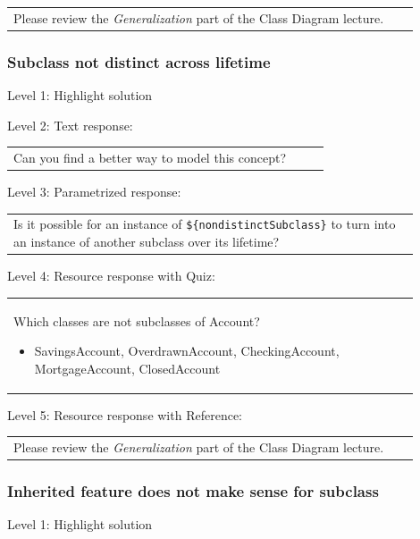 \begin{tabular}{|p{0.9\linewidth}}
Please review the \textit{Generalization} part of the Class Diagram lecture.
\end{tabular} \medskip


\subsubsection{Subclass not distinct across lifetime}

\noindent Level 1: Highlight solution  \medskip

\noindent Level 2: Text response: \medskip

\begin{tabular}{|p{0.9\linewidth}}
Can you find a better way to model this concept?
\end{tabular} \medskip

\noindent Level 3: Parametrized response: \medskip

\begin{tabular}{|p{0.9\linewidth}}
Is it possible for an instance of \verb|${nondistinctSubclass}| to turn into an instance of another subclass over its lifetime?
\end{tabular} \medskip

\noindent Level 4: Resource response with Quiz: \medskip

\begin{tabular}{|p{0.9\linewidth}}
Which classes are not subclasses of Account?
\begin{itemize}
    \item SavingsAccount, OverdrawnAccount, CheckingAccount, MortgageAccount, ClosedAccount
\end{itemize}

\end{tabular} \medskip

\noindent Level 5: Resource response with Reference: \medskip

\begin{tabular}{|p{0.9\linewidth}}
Please review the \textit{Generalization} part of the Class Diagram lecture.
\end{tabular} \medskip


\subsubsection{Inherited feature does not make sense for subclass}

\noindent Level 1: Highlight solution  \medskip

